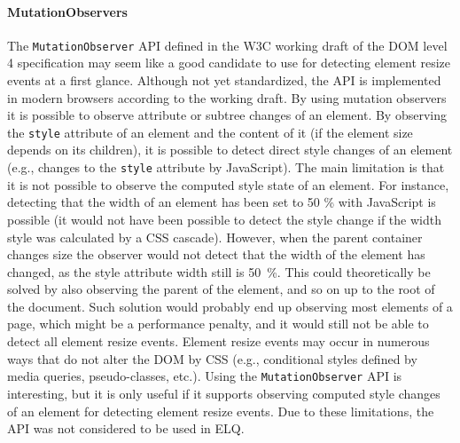 \documentclass[a4paper,11pt]{kth-mag}
\newcommand{\code}[1]{\texttt{#1}}
\begin{document}
        \paragraph{MutationObservers}
        The \code{MutationObserver} \gls{API} defined in the W3C working draft of the DOM level 4 specification \cite{w3c_dom_4} may seem like a good candidate to use for detecting \gls{element} resize events at a first glance.
        Although not yet standardized, the \gls{API} is implemented in modern \glspl{browser} according to the working draft.
        By using mutation observers it is possible to observe attribute or subtree changes of an \gls{element}.
        By observing the \code{style} attribute of an \gls{element} and the content of it (if the \gls{element} size depends on its children), it is possible to detect direct style changes of an \gls{element} (e.g., changes to the \code{style} attribute by \gls{JavaScript}).
        The main limitation is that it is not possible to observe the computed style state of an \gls{element}.
        For instance, detecting that the width of an \gls{element} has been set to 50 \% with \gls{JavaScript} is possible (it would not have been possible to detect the style change if the width style was calculated by a CSS cascade).
        However, when the parent container changes size the observer would not detect that the width of the \gls{element} has changed, as the style attribute width still is 50~\%.
        This could theoretically be solved by also observing the parent of the \gls{element}, and so on up to the root of the \gls{document}.
        Such solution would probably end up observing most \glspl{element} of a page, which might be a performance penalty, and it would still not be able to detect all element resize events.
        Element resize events may occur in numerous ways that do not alter the \gls{DOM} by CSS (e.g., conditional styles defined by \gls{media queries}, pseudo-classes, etc.).
        Using the \code{MutationObserver} \gls{API} is interesting, but it is only useful if it supports observing computed style changes of an element for detecting element resize events.
        Due to these limitations, the \gls{API} was not considered to be used in \gls{ELQ}.

\end{document}
